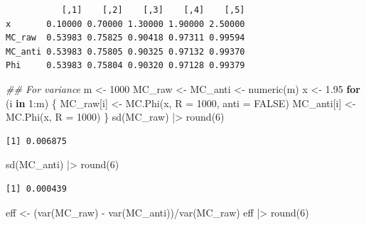 \documentclass[
  letterpaper,
  DIV=11,
  numbers=noendperiod]{scrreprt}
\newenvironment{Shaded}{\begin{snugshade}}{\end{snugshade}}
\newcommand{\AttributeTok}[1]{\textcolor[rgb]{0.40,0.45,0.13}{#1}}
\newcommand{\ConstantTok}[1]{\textcolor[rgb]{0.56,0.35,0.01}{#1}}
\newcommand{\ControlFlowTok}[1]{\textcolor[rgb]{0.00,0.23,0.31}{\textbf{#1}}}
\newcommand{\DecValTok}[1]{\textcolor[rgb]{0.68,0.00,0.00}{#1}}
\newcommand{\DocumentationTok}[1]{\textcolor[rgb]{0.37,0.37,0.37}{\textit{#1}}}
\newcommand{\FloatTok}[1]{\textcolor[rgb]{0.68,0.00,0.00}{#1}}
\newcommand{\FunctionTok}[1]{\textcolor[rgb]{0.28,0.35,0.67}{#1}}
\newcommand{\NormalTok}[1]{\textcolor[rgb]{0.00,0.23,0.31}{#1}}
\newcommand{\OtherTok}[1]{\textcolor[rgb]{0.00,0.23,0.31}{#1}}
\newcommand{\SpecialCharTok}[1]{\textcolor[rgb]{0.37,0.37,0.37}{#1}}
\begin{document}
\begin{verbatim}
           [,1]    [,2]    [,3]    [,4]    [,5]
x       0.10000 0.70000 1.30000 1.90000 2.50000
MC_raw  0.53983 0.75825 0.90418 0.97311 0.99594
MC_anti 0.53983 0.75805 0.90325 0.97132 0.99370
Phi     0.53983 0.75804 0.90320 0.97128 0.99379
\end{verbatim}

\begin{Shaded}
\begin{Highlighting}[]
\DocumentationTok{\#\# For variance}
\NormalTok{m }\OtherTok{\textless{}{-}} \DecValTok{1000}
\NormalTok{MC\_raw }\OtherTok{\textless{}{-}}\NormalTok{ MC\_anti }\OtherTok{\textless{}{-}} \FunctionTok{numeric}\NormalTok{(m)}
\NormalTok{x }\OtherTok{\textless{}{-}} \FloatTok{1.95}
\ControlFlowTok{for}\NormalTok{ (i }\ControlFlowTok{in} \DecValTok{1}\SpecialCharTok{:}\NormalTok{m) \{}
\NormalTok{  MC\_raw[i] }\OtherTok{\textless{}{-}} \FunctionTok{MC.Phi}\NormalTok{(x, }\AttributeTok{R =} \DecValTok{1000}\NormalTok{, }\AttributeTok{anti =} \ConstantTok{FALSE}\NormalTok{)}
\NormalTok{  MC\_anti[i] }\OtherTok{\textless{}{-}} \FunctionTok{MC.Phi}\NormalTok{(x, }\AttributeTok{R =} \DecValTok{1000}\NormalTok{)}
\NormalTok{\}}
\FunctionTok{sd}\NormalTok{(MC\_raw) }\SpecialCharTok{|\textgreater{}} \FunctionTok{round}\NormalTok{(}\DecValTok{6}\NormalTok{) }
\end{Highlighting}
\end{Shaded}

\begin{verbatim}
[1] 0.006875
\end{verbatim}

\begin{Shaded}
\begin{Highlighting}[]
\FunctionTok{sd}\NormalTok{(MC\_anti) }\SpecialCharTok{|\textgreater{}} \FunctionTok{round}\NormalTok{(}\DecValTok{6}\NormalTok{)}
\end{Highlighting}
\end{Shaded}

\begin{verbatim}
[1] 0.000439
\end{verbatim}

\begin{Shaded}
\begin{Highlighting}[]
\NormalTok{eff }\OtherTok{\textless{}{-}}\NormalTok{ (}\FunctionTok{var}\NormalTok{(MC\_raw) }\SpecialCharTok{{-}} \FunctionTok{var}\NormalTok{(MC\_anti))}\SpecialCharTok{/}\FunctionTok{var}\NormalTok{(MC\_raw) }
\NormalTok{eff }\SpecialCharTok{|\textgreater{}} \FunctionTok{round}\NormalTok{(}\DecValTok{6}\NormalTok{)}
\end{Highlighting}
\end{Shaded}
\end{document}
